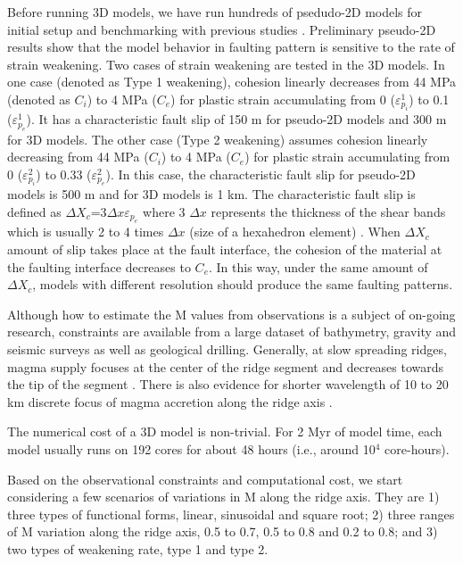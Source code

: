 \documentclass[draft,gc]{agutex}
\begin{document}
\begin{article}
Before running 3D models, we have run hundreds of psedudo-2D models for initial setup and benchmarking with previous studies \citep[e.g.,][]{Buck2005, Tucholke2008}. Preliminary pseudo-2D results show that the model behavior in faulting pattern is sensitive to the rate of strain weakening. Two cases of strain weakening are tested in the 3D models. In one case (denoted as Type 1 weakening), cohesion linearly decreases from 44 MPa (denoted as $C_{i}$) to 4 MPa ($C_{e}$) for plastic strain accumulating from 0 ($\varepsilon_{p_{i}}^{1}$) to 0.1 ($\varepsilon_{p_{e}}^{1}$). It has a characteristic fault slip of 150 m for pseudo-2D models and 300 m for 3D models. The other case (Type 2 weakening) assumes cohesion linearly decreasing from 44 MPa ($C_{i}$) to 4 MPa ($C_{e}$) for plastic strain accumulating from 0 ($\varepsilon_{p_{i}}^{2}$) to 0.33 ($\varepsilon_{p_{e}}^{2}$). In this case, the characteristic fault slip for pseudo-2D models is 500 m and for 3D models is 1 km. The characteristic fault slip is defined as $\Delta X_{c}$=3$\Delta x \varepsilon_{p_{e}}$ where 3 $\Delta x$ represents the thickness of the shear bands which is usually 2 to 4 times $\Delta x$ (size of a hexahedron element) \citep{Lavier2000}. When $\Delta X_{c}$ amount of slip takes place at the fault interface, the cohesion of the material at the faulting interface decreases to $C_{e}$. In this way, under the same amount of $\Delta X_{c}$, models with different resolution should produce the same faulting patterns.

Although how to estimate the M values from observations is a subject of on-going research, constraints are available from a large dataset of bathymetry, gravity and seismic surveys as well as geological drilling. Generally, at slow spreading ridges, magma supply focuses at the center of the ridge segment and decreases towards the tip of the segment \citep[e.g.,][]{Tolstoy1993,Chen1999,Carbotte2015}. There is also evidence for shorter wavelength of 10 to 20 km discrete focus of magma accretion along the ridge axis \citep{Lin1990}.

The numerical cost of a 3D model is non-trivial. For 2 Myr of model time, each model usually runs on 192 cores for about 48 hours (i.e., around 10$^{4}$ core-hours).

Based on the observational constraints and computational cost, we start considering a few scenarios of variations in M along the ridge axis. They are 1) three types of functional forms, linear, sinusoidal and square root; 2) three ranges of M variation along the ridge axis, 0.5 to 0.7, 0.5 to 0.8 and 0.2 to 0.8; and 3) two types of weakening rate, type 1 and type 2.


\end{article}
\end{document}
